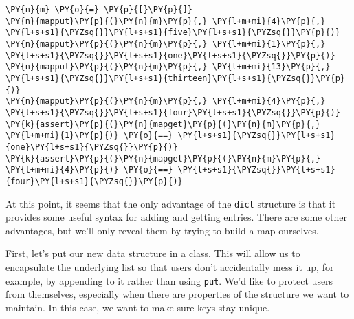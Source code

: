 \begin{Verbatim}[commandchars=\\\{\}]
\PY{n}{m} \PY{o}{=} \PY{p}{[}\PY{p}{]}
\PY{n}{mapput}\PY{p}{(}\PY{n}{m}\PY{p}{,} \PY{l+m+mi}{4}\PY{p}{,} \PY{l+s+s1}{\PYZsq{}}\PY{l+s+s1}{five}\PY{l+s+s1}{\PYZsq{}}\PY{p}{)}
\PY{n}{mapput}\PY{p}{(}\PY{n}{m}\PY{p}{,} \PY{l+m+mi}{1}\PY{p}{,} \PY{l+s+s1}{\PYZsq{}}\PY{l+s+s1}{one}\PY{l+s+s1}{\PYZsq{}}\PY{p}{)}
\PY{n}{mapput}\PY{p}{(}\PY{n}{m}\PY{p}{,} \PY{l+m+mi}{13}\PY{p}{,} \PY{l+s+s1}{\PYZsq{}}\PY{l+s+s1}{thirteen}\PY{l+s+s1}{\PYZsq{}}\PY{p}{)}
\PY{n}{mapput}\PY{p}{(}\PY{n}{m}\PY{p}{,} \PY{l+m+mi}{4}\PY{p}{,} \PY{l+s+s1}{\PYZsq{}}\PY{l+s+s1}{four}\PY{l+s+s1}{\PYZsq{}}\PY{p}{)}
\PY{k}{assert}\PY{p}{(}\PY{n}{mapget}\PY{p}{(}\PY{n}{m}\PY{p}{,} \PY{l+m+mi}{1}\PY{p}{)} \PY{o}{==} \PY{l+s+s1}{\PYZsq{}}\PY{l+s+s1}{one}\PY{l+s+s1}{\PYZsq{}}\PY{p}{)}
\PY{k}{assert}\PY{p}{(}\PY{n}{mapget}\PY{p}{(}\PY{n}{m}\PY{p}{,} \PY{l+m+mi}{4}\PY{p}{)} \PY{o}{==} \PY{l+s+s1}{\PYZsq{}}\PY{l+s+s1}{four}\PY{l+s+s1}{\PYZsq{}}\PY{p}{)}
\end{Verbatim}



At this point, it seems that the only advantage of the \texttt{dict} structure is that it provides some useful syntax for adding and getting entries.  There are some other advantages, but we'll only reveal them by trying to build a map ourselves.


First, let's put our new data structure in a class.  This will allow us to encapsulate the underlying list so that users don't accidentally mess it up, for example, by appending to it rather than using \texttt{put}.  We'd like to protect users from themselves, especially when there are properties of the structure we want to maintain.  In this case, we want to make sure keys stay unique.

